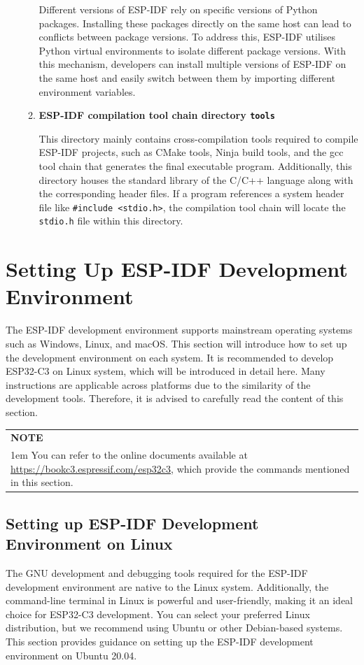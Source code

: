 \documentclass[a4paper,12pt,openany]{book}
\newcommand{\note}[2][NOTE]{ %
\vspace{6pt}
\begin{tabular}{b{\textwidth}}
\hline
\fontfamily{phv}\selectfont \textbf{#1}\\
\leftskip 1em #2\\
\hline
\end{tabular}
}
\begin{document}
\begin{enumerate}[label=(\arabic*),leftmargin=2em]
\begin{enumerate}[label=\textbf{\alph*.},leftmargin=0em]
        Different versions of ESP-IDF rely on specific versions of Python packages. Installing these packages directly on the same host can lead to conflicts between package versions. To address this, ESP-IDF utilises Python virtual environments to isolate different package versions. With this mechanism, developers can install multiple versions of ESP-IDF on the same host and easily switch between them by importing different environment variables.

        \item \textbf{ESP-IDF compilation tool chain directory \texttt{tools}}

        This directory mainly contains cross-compilation tools required to compile ESP-IDF projects, such as CMake tools, Ninja build tools, and the gcc tool chain that generates the final executable program. Additionally, this directory houses the standard library of the C/C++ language along with the corresponding header files. If a program references a system header file like \verb|#include <stdio.h>|, the compilation tool chain will locate the \verb|stdio.h| file within this directory.
    \end{enumerate}
\end{enumerate}

\section{Setting Up ESP-IDF Development Environment}
The ESP-IDF development environment supports mainstream operating systems such as Windows, Linux, and macOS. This section will introduce how to set up the development environment on each system. It is recommended to develop ESP32-C3 on Linux system, which will be introduced in detail here. Many instructions are applicable across platforms due to the similarity of the development tools. Therefore, it is advised to carefully read the content of this section.

\note{You can refer to the online documents available at
\url{https://bookc3.espressif.com/esp32c3}, which provide the commands mentioned in this section.}

\subsection{Setting up ESP-IDF Development Environment on Linux}
The GNU development and debugging tools required for the ESP-IDF development environment are native to the Linux system. Additionally, the command-line terminal in Linux is powerful and user-friendly, making it an ideal choice for ESP32-C3 development. You can select your preferred Linux distribution, but we recommend using Ubuntu or other Debian-based systems. This section provides guidance on setting up the ESP-IDF development environment on Ubuntu 20.04.
\end{document}
